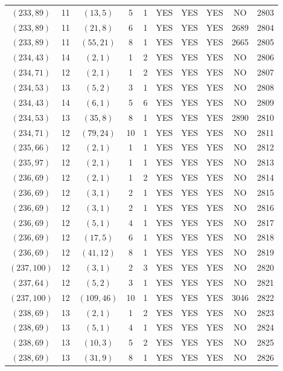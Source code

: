 \begin{longtable}{|c|c|c|c|c|c|c|c|c|c|}
$(233, 89)$ & 11 & $(13, 5)$ & 5 & 1 & YES & YES & YES & NO & 2803\\
$(233, 89)$ & 11 & $(21, 8)$ & 6 & 1 & YES & YES & YES & 2689 & 2804\\
$(233, 89)$ & 11 & $(55, 21)$ & 8 & 1 & YES & YES & YES & 2665 & 2805\\
$(234, 43)$ & 14 & $(2, 1)$ & 1 & 2 & YES & YES & YES & NO & 2806\\
$(234, 71)$ & 12 & $(2, 1)$ & 1 & 2 & YES & YES & YES & NO & 2807\\
$(234, 53)$ & 13 & $(5, 2)$ & 3 & 1 & YES & YES & YES & NO & 2808\\
$(234, 43)$ & 14 & $(6, 1)$ & 5 & 6 & YES & YES & YES & NO & 2809\\
$(234, 53)$ & 13 & $(35, 8)$ & 8 & 1 & YES & YES & YES & 2890 & 2810\\
$(234, 71)$ & 12 & $(79, 24)$ & 10 & 1 & YES & YES & YES & NO & 2811\\
$(235, 66)$ & 12 & $(2, 1)$ & 1 & 1 & YES & YES & YES & NO & 2812\\
$(235, 97)$ & 12 & $(2, 1)$ & 1 & 1 & YES & YES & YES & NO & 2813\\
$(236, 69)$ & 12 & $(2, 1)$ & 1 & 2 & YES & YES & YES & NO & 2814\\
$(236, 69)$ & 12 & $(3, 1)$ & 2 & 1 & YES & YES & YES & NO & 2815\\
$(236, 69)$ & 12 & $(3, 1)$ & 2 & 1 & YES & YES & YES & NO & 2816\\
$(236, 69)$ & 12 & $(5, 1)$ & 4 & 1 & YES & YES & YES & NO & 2817\\
$(236, 69)$ & 12 & $(17, 5)$ & 6 & 1 & YES & YES & YES & NO & 2818\\
$(236, 69)$ & 12 & $(41, 12)$ & 8 & 1 & YES & YES & YES & NO & 2819\\
$(237, 100)$ & 12 & $(3, 1)$ & 2 & 3 & YES & YES & YES & NO & 2820\\
$(237, 64)$ & 12 & $(5, 2)$ & 3 & 1 & YES & YES & YES & NO & 2821\\
$(237, 100)$ & 12 & $(109, 46)$ & 10 & 1 & YES & YES & YES & 3046 & 2822\\
$(238, 69)$ & 13 & $(2, 1)$ & 1 & 2 & YES & YES & YES & NO & 2823\\
$(238, 69)$ & 13 & $(5, 1)$ & 4 & 1 & YES & YES & YES & NO & 2824\\
$(238, 69)$ & 13 & $(10, 3)$ & 5 & 2 & YES & YES & YES & NO & 2825\\
$(238, 69)$ & 13 & $(31, 9)$ & 8 & 1 & YES & YES & YES & NO & 2826\\

\end{longtable}

